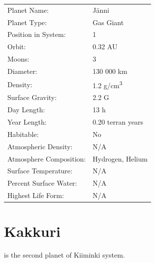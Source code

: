 \documentclass{tufte-book}
\begin{document}
\bigskip
\begin{minipage}{\textwidth}
\begin{center}
\begin{tabular}{ll}
\toprule
Planet Name: & J\"{a}nni \\
Planet Type: & Gas Giant \\
Position in System: & 1 \\
Orbit: & 0.32 AU \\
Moons: & 3 \\
Diameter: & 130 000 km \\
Density: & 1.2 g/cm\textsuperscript{3} \\
Surface Gravity: & 2.2 G \\
Day Length: & 13 h \\
Year Length: & 0.20 terran years \\
Habitable: & No \\
\quad Atmospheric Density: & N/A \\
\quad Atmosphere Composition: & Hydrogen, Helium \\
\quad Surface Temperature: & N/A \\
\quad Percent Surface Water: & N/A \\
\quad Highest Life Form: & N/A \\

\bottomrule
\end{tabular}
\end{center}
\end{minipage}

\section{Kakkuri}

 is the second planet of Kiiminki system.
\end{document}
